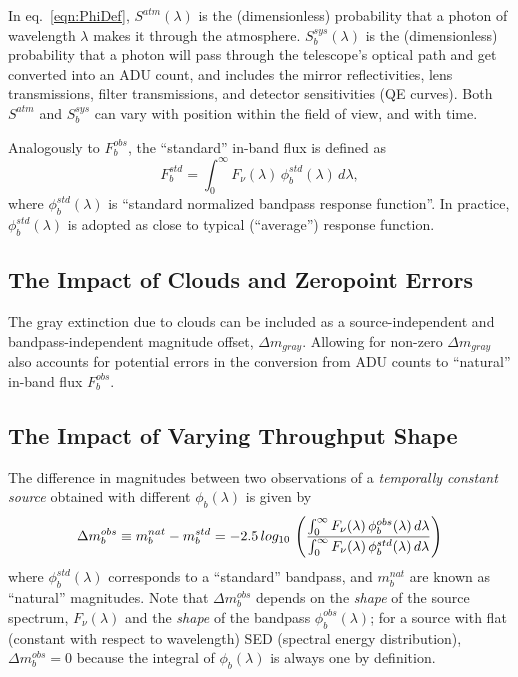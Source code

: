 \documentclass[12pt,preprint]{aastex}
\begin{document}
In eq.~\ref{eqn:PhiDef}, $S^{atm}(\lambda)$ is the (dimensionless) probability that a photon of 
wavelength $\lambda$ makes it through the atmosphere. $S_b^{sys}(\lambda)$ is the 
(dimensionless) probability that a photon will pass through the telescope's optical path and get
converted into an ADU count, and includes the mirror reflectivities, lens transmissions, filter
transmissions, and detector sensitivities (QE curves). Both $S^{atm}$ and $S_b^{sys}$ can vary 
with position within the field of view, and with time. 

Analogously to $F_b^{obs}$, the ``standard'' in-band flux is defined as 
\begin{equation}
\label{eqn:Fstd}
     F_b^{std} = \int_0^\infty {F_\nu(\lambda) \,\phi_b^{std}(\lambda) \, d\lambda}, 
\end{equation}
where $\phi_b^{std}(\lambda)$ is ``standard normalized bandpass response function''.  
In practice, $\phi_b^{std}(\lambda)$ is adopted as close to typical (``average'') response 
function. 


\subsection{The Impact of Clouds and Zeropoint Errors} 

The gray extinction due to clouds can be included as a source-independent and bandpass-independent
magnitude offset, $\Delta m_{gray}$. Allowing for non-zero $\Delta m_{gray}$ also accounts for potential 
errors in the conversion from ADU counts to ``natural'' in-band flux $F_b^{obs}$. 


\subsection{The Impact of Varying Throughput Shape} 

The difference in magnitudes between two observations of a {\it temporally constant source} obtained 
with different $\phi_b(\lambda)$ is given by 
\begin{equation}
\label{eqn:Delta_m}
\Delta m_b^{obs}  \equiv m_b^{nat} - m_b^{std}  =  -2.5 \, log_{10} \,  \left( { \int_0^\infty {F_\nu(\lambda) \,
    \phi_b^{obs}(\lambda) \, d\lambda} \over \int_0^\infty {F_\nu(\lambda) \,
    \phi_b^{std}(\lambda) \, d\lambda}} \right)
\end{equation}
where $\phi_b^{std}(\lambda)$ corresponds to a ``standard'' bandpass, and $m_b^{nat}$ are
known as ``natural'' magnitudes. Note that $\Delta m_b^{obs}$ depends on the {\it shape} of the 
source spectrum, $F_\nu(\lambda)$ and the {\it shape} of the bandpass
$\phi_b^{obs}(\lambda)$; for a source with flat (constant with respect to wavelength) SED (spectral
energy distribution), $\Delta m_b^{obs}=0$ because the integral of $\phi_b(\lambda)$ is always one
by definition. 
\end{document}
